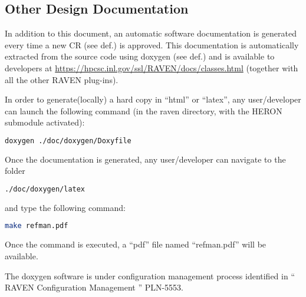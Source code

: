 \subsection{Other Design Documentation}

In addition to this document, an automatic software documentation
is generated every time a new CR (see def.) is approved. This
documentation is automatically extracted from the source code using
doxygen (see def.) and is available to developers at
\url{https://hpcsc.inl.gov/ssl/RAVEN/docs/classes.html} (together with all the other RAVEN plug-ins).

In order to generate(locally) a hard copy in ``html'' or ``latex'', any user/developer can 
launch the 
following command (in the raven directory, with the HERON submodule activated):
\begin{lstlisting}[language=bash]
doxygen ./doc/doxygen/Doxyfile
\end{lstlisting}
Once the documentation is generated, any user/developer can navigate to the folder
\begin{lstlisting}[language=bash]
./doc/doxygen/latex
\end{lstlisting}
and type the following command:
\begin{lstlisting}[language=bash]
make refman.pdf
\end{lstlisting}
Once the command is executed, a ``pdf'' file named ``refman.pdf'' will be available.

The doxygen software is under configuration management process identified in
`` RAVEN Configuration Management '' PLN-5553.
